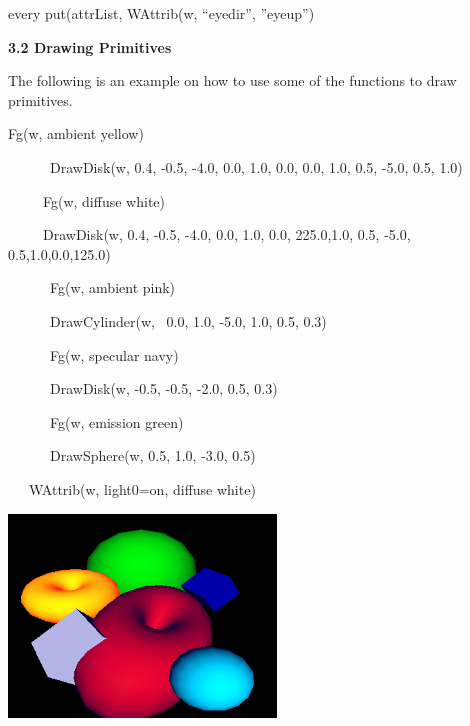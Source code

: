 \documentclass[letterpaper]{article}
\begin{document}
\bigskip

{\sffamily
every put(attrList, WAttrib(w, ``eyedir'', ''eyeup'')}


\bigskip


\bigskip

{\bfseries
3.2 Drawing Primitives}


\bigskip

{
The following is an example on how to use some of the functions to draw primitives. }


\bigskip

{\sffamily
Fg(w, {\textquotedbl}ambient yellow{\textquotedbl})}

{\sffamily
\ \ \ \ \ \ DrawDisk(w, 0.4, -0.5, -4.0, 0.0, 1.0, 0.0, 0.0, 1.0, 0.5, -5.0, 0.5, 1.0) \ \ }

{\sffamily
\ \ \ \ \ Fg(w, {\textquotedbl}diffuse white{\textquotedbl})}

{\sffamily
\ \ \ \ \ DrawDisk(w, 0.4, -0.5, -4.0, 0.0, 1.0, 0.0, 225.0,1.0, 0.5, -5.0, 0.5,1.0,0.0,125.0)}

{\sffamily
\ \ \ \ \ \ Fg(w, {\textquotedbl}ambient pink{\textquotedbl})}

{\sffamily
\ \ \ \ \ \ DrawCylinder(w, \ 0.0, 1.0, -5.0, 1.0, 0.5, 0.3)}

{\sffamily
\ \ \ \ \ \ Fg(w, {\textquotedbl}specular navy{\textquotedbl})}

{\sffamily
\ \ \ \ \ \ DrawDisk(w, -0.5, -0.5, -2.0, 0.5, 0.3)}

{\sffamily
\ \ \ \ \ \ Fg(w, {\textquotedbl}emission green{\textquotedbl})}

{\sffamily
\ \ \ \ \ \ DrawSphere(w, 0.5, 1.0, -3.0, 0.5)}

{\sffamily
\ \ \ WAttrib(w, {\textquotedbl}light0=on, diffuse white{\textquotedbl})}

 \includegraphics[width=2.8071in,height=2.1335in]{utr9/utr9-img021.png} 
\end{document}
